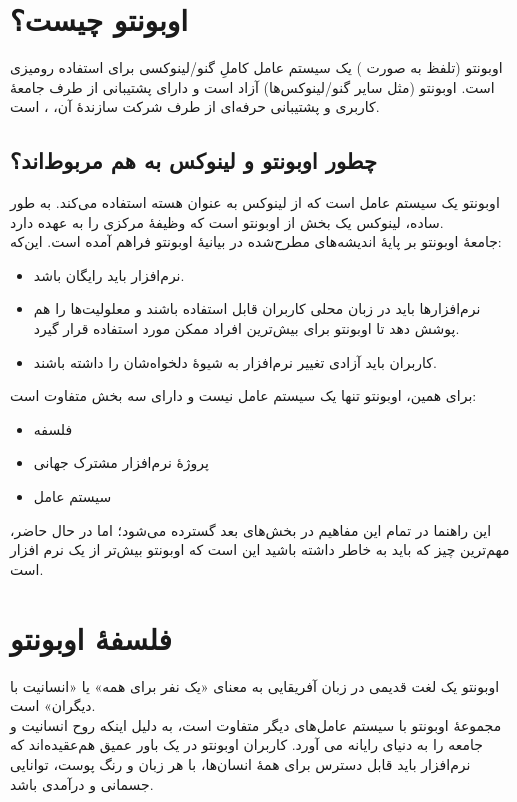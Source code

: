 \section{اوبونتو چیست؟}
اوبونتو (تلفظ به صورت ) یک سیستم عامل کاملِ گنو/لینوکسی برای استفاده رومیزی است. اوبونتو (مثل سایر گنو/لینوکس‌ها) آزاد است و دارای پشتیبانی از طرف جامعهٔ کاربری و پشتیبانی حرفه‌ای از طرف شرکت سازندهٔ آن، ، است.\\
\subsection{چطور اوبونتو  و لینوکس به هم مربوط‌اند؟}
اوبونتو یک سیستم عامل است که از لینوکس به عنوان هسته استفاده می‌کند. به طور ساده، لینوکس یک بخش از اوبونتو  است که وظیفهٔ مرکزی را به عهده دارد.\\

جامعهٔ اوبونتو بر پایهٔ اندیشه‌های مطرح‌شده در بیانیهٔ اوبونتو فراهم آمده است. این‌که:

\begin{itemize}
\item نرم‌افزار باید رایگان باشد.
\item نرم‌افزارها باید در زبان محلی کاربران قابل استفاده باشند و معلولیت‌ها را هم پوشش دهد تا اوبونتو برای بیش‌ترین افراد ممکن مورد استفاده قرار گیرد.
\item کاربران باید آزادی تغییر نرم‌افزار به شیوهٔ دلخواه‌شان را داشته باشند.\\
\end{itemize}

برای همین، اوبونتو تنها یک سیستم عامل نیست و دارای سه بخش متفاوت است:

\begin{itemize}
\item فلسفه
\item پروژهٔ نرم‌افزار مشترک جهانی
\item سیستم عامل
\end{itemize}

این راهنما در تمام این مفاهیم در بخش‌های بعد گسترده می‌شود؛ اما در حال حاضر، مهم‌ترین چیز که باید به خاطر داشته باشید این است که اوبونتو بیش‌تر از یک نرم افزار است.

\section{فلسفهٔ اوبونتو}
اوبونتو یک لغت قدیمی در زبان آفریقایی به معنای «یک نفر برای همه» یا «انسانیت با دیگران» است.\\
مجموعهٔ اوبونتو با سیستم عامل‌های دیگر متفاوت است، به دلیل اینکه روح انسانیت و جامعه را به دنیای رایانه می آورد. کاربران اوبونتو در یک باور عمیق هم‌عقیده‌اند که نرم‌افزار باید قابل دسترس برای همهٔ انسان‌ها، با هر زبان و رنگ پوست، توانایی جسمانی و درآمدی باشد.

